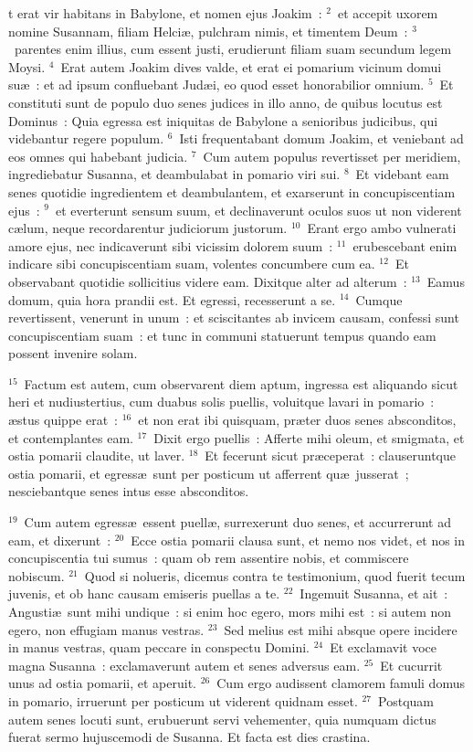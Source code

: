 \bchapter
{}t erat vir habitans in Babylone, et nomen ejus Joakim~:
${}^{2}$~et accepit uxorem nomine Susannam, filiam Helci\ae , pulchram nimis, et timentem Deum~:
${}^{3}$~parentes enim illius, cum essent justi, erudierunt filiam suam secundum legem Moysi.
${}^{4}$~Erat autem Joakim dives valde, et erat ei pomarium vicinum domui su\ae~: et ad ipsum confluebant Jud\ae i, eo quod esset honorabilior omnium.
${}^{5}$~Et constituti sunt de populo duo senes judices in illo anno, de quibus locutus est Dominus~: Quia egressa est iniquitas de Babylone a senioribus judicibus, qui videbantur regere populum.
${}^{6}$~Isti frequentabant domum Joakim, et veniebant ad eos omnes qui habebant judicia.
${}^{7}$~Cum autem populus revertisset per meridiem, ingrediebatur Susanna, et deambulabat in pomario viri sui.
${}^{8}$~Et videbant eam senes quotidie ingredientem et deambulantem, et exarserunt in concupiscentiam ejus~:
${}^{9}$~et everterunt sensum suum, et declinaverunt oculos suos ut non viderent c\ae lum, neque recordarentur judiciorum justorum.
${}^{10}$~Erant ergo ambo vulnerati amore ejus, nec indicaverunt sibi vicissim dolorem suum~:
${}^{11}$~erubescebant enim indicare sibi concupiscentiam suam, volentes concumbere cum ea.
${}^{12}$~Et observabant quotidie sollicitius videre eam. Dixitque alter ad alterum~:
${}^{13}$~Eamus domum, quia hora prandii est. Et egressi, recesserunt a se.
${}^{14}$~Cumque revertissent, venerunt in unum~: et sciscitantes ab invicem causam, confessi sunt concupiscentiam suam~: et tunc in communi statuerunt tempus quando eam possent invenire solam.


${}^{15}$~Factum est autem, cum observarent diem aptum, ingressa est aliquando sicut heri et nudiustertius, cum duabus solis puellis, voluitque lavari in pomario~: \ae stus quippe erat~:
${}^{16}$~et non erat ibi quisquam, pr\ae ter duos senes absconditos, et contemplantes eam.
${}^{17}$~Dixit ergo puellis~: Afferte mihi oleum, et smigmata, et ostia pomarii claudite, ut laver.
${}^{18}$~Et fecerunt sicut pr\ae ceperat~: clauseruntque ostia pomarii, et egress\ae\ sunt per posticum ut afferrent qu\ae\ jusserat~; nesciebantque senes intus esse absconditos.


${}^{19}$~Cum autem egress\ae\ essent puell\ae , surrexerunt duo senes, et accurrerunt ad eam, et dixerunt~:
${}^{20}$~Ecce ostia pomarii clausa sunt, et nemo nos videt, et nos in concupiscentia tui sumus~: quam ob rem assentire nobis, et commiscere nobiscum.
${}^{21}$~Quod si nolueris, dicemus contra te testimonium, quod fuerit tecum juvenis, et ob hanc causam emiseris puellas a te.
${}^{22}$~Ingemuit Susanna, et ait~: Angusti\ae\ sunt mihi undique~: si enim hoc egero, mors mihi est~: si autem non egero, non effugiam manus vestras.
${}^{23}$~Sed melius est mihi absque opere incidere in manus vestras, quam peccare in conspectu Domini.
${}^{24}$~Et exclamavit voce magna Susanna~: exclamaverunt autem et senes adversus eam.
${}^{25}$~Et cucurrit unus ad ostia pomarii, et aperuit.
${}^{26}$~Cum ergo audissent clamorem famuli domus in pomario, irruerunt per posticum ut viderent quidnam esset.
${}^{27}$~Postquam autem senes locuti sunt, erubuerunt servi vehementer, quia numquam dictus fuerat sermo hujuscemodi de Susanna. Et facta est dies crastina.



